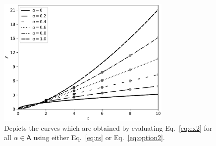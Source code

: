 \documentclass{article}
\theoremstyle{theorem}
\theoremstyle{definition}
\begin{document}
\begin{figure}[htb]
\centering
\includegraphics[width=0.75\textwidth]{func_eval2.eps}
\caption{Depicts the curves which are obtained by evaluating Eq.~\eqref{eq:ex2} for all $\alpha\in \mathsf{A}$ using either Eq.~\eqref{eq:rs} or Eq.~\eqref{eq:option2}.}
\label{fig:eval2}
\end{figure}


\end{document}
